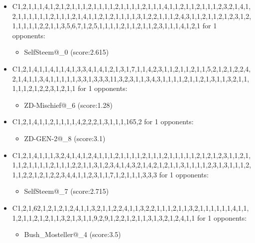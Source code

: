 \begin{appendices}
\begin{itemize}
        \item C1,2,1,1,1,4,1,2,1,2,1,1,1,2,1,1,1,1,2,1,1,1,1,2,1,1,1,4,1,1,2,1,1,2,1,1,1,2,3,2,1,4,1,2,1,1,1,1,1,1,2,1,1,1,2,1,4,1,1,2,1,2,1,1,1,1,3,1,2,2,1,1,1,2,4,3,1,1,2,1,1,2,1,2,3,1,2,1,1,1,1,1,2,2,1,1,3,5,6,7,1,2,5,1,1,1,1,2,1,1,2,1,1,2,3,1,1,1,4,1,2,1 for 1 opponents:
        \begin{multicols}{3}
            \begin{itemize}
                \item SelfSteem@\_0 (score:2.615)
            \end{itemize}
        \end{multicols}

        \item C1,2,1,4,1,1,4,1,1,4,1,3,3,4,1,4,1,2,1,3,1,7,1,1,4,2,3,1,1,2,1,1,2,1,1,5,2,1,2,1,2,2,4,2,1,4,1,1,3,4,1,1,1,1,1,3,3,1,3,3,3,11,3,2,3,1,1,3,4,3,1,1,1,1,2,1,1,2,1,3,1,1,3,2,1,1,1,1,1,2,1,2,2,3,1,2,1,1 for 1 opponents:
        \begin{multicols}{3}
            \begin{itemize}
                \item ZD-Mischief@\_6 (score:1.28)
            \end{itemize}
        \end{multicols}

        \item C1,2,1,4,1,1,2,1,1,1,1,4,2,2,2,1,3,1,1,1,165,2 for 1 opponents:
        \begin{multicols}{3}
            \begin{itemize}
                \item ZD-GEN-2@\_8 (score:3.1)
            \end{itemize}
        \end{multicols}

        \item C1,2,1,4,1,1,1,3,2,4,1,4,1,2,4,1,1,1,2,1,1,1,1,2,1,1,1,2,1,1,1,1,1,2,1,2,1,2,3,1,1,2,1,1,1,2,1,1,1,1,2,1,1,1,2,2,1,1,3,1,2,3,4,1,4,3,2,1,4,2,1,2,1,1,3,1,1,1,1,2,3,1,3,1,1,1,2,1,1,2,2,1,2,1,2,2,3,4,4,1,1,2,3,1,1,7,1,2,1,1,1,3,3,3 for 1 opponents:
        \begin{multicols}{3}
            \begin{itemize}
                \item SelfSteem@\_7 (score:2.715)
            \end{itemize}
        \end{multicols}

        \item C1,2,1,62,1,2,1,2,1,2,4,1,1,3,2,1,1,2,2,4,1,1,3,2,2,1,1,1,2,1,1,3,2,1,1,1,1,1,1,4,1,1,1,2,1,1,2,1,2,1,1,3,2,1,3,1,1,9,2,9,1,2,2,1,2,1,1,3,1,3,2,1,2,4,1,1 for 1 opponents:
        \begin{multicols}{3}
            \begin{itemize}
                \item Bush\_Mosteller@\_4 (score:3.5)
            \end{itemize}
        \end{multicols}


\end{itemize}
\end{appendices}
